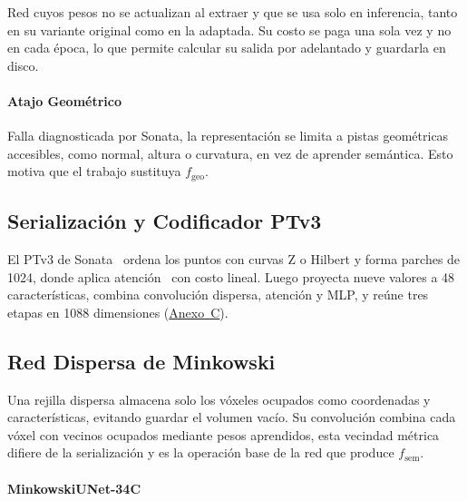 Red cuyos pesos no se actualizan al extraer y que se usa solo en inferencia, tanto en su variante original como en la adaptada. Su costo se paga
una sola vez y no en cada época, lo que permite calcular su salida por adelantado
y guardarla en disco.

\paragraph*{Atajo Geométrico}
\label{sec:atajo}

Falla diagnosticada por Sonata, la representación se limita a pistas geométricas
accesibles, como normal, altura o curvatura, en vez de aprender semántica. Esto
motiva que el trabajo sustituya $f_{\mathrm{geo}}$.

\subsection{Serialización y Codificador PTv3}
\label{sec:serializacion}

El PTv3 de Sonata~\cite{wu2024ptv3} ordena los puntos con curvas Z o Hilbert y
forma parches de 1024, donde aplica atención~\cite{vaswani2017attention} con costo lineal.
Luego proyecta nueve valores a 48 características, combina convolución dispersa,
atención y MLP, y reúne tres etapas en 1088 dimensiones (\hyperref[sec:arq-sonata]{Anexo~C}).

\subsection{Red Dispersa de Minkowski}
\label{sec:rejilla}
\label{sec:tensor}

Una rejilla dispersa almacena solo los vóxeles ocupados como coordenadas y
características, evitando guardar el volumen vacío. Su convolución combina cada
vóxel con vecinos ocupados mediante pesos aprendidos, esta vecindad métrica difiere
de la serialización y es la operación base de la red que produce $f_{\mathrm{sem}}$.

\paragraph*{MinkowskiUNet-34C}
\label{sec:minkunet}

